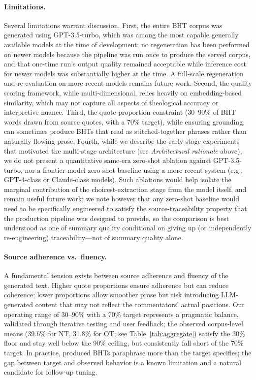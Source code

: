 \paragraph{Limitations.}
Several limitations warrant discussion. First, the entire BHT corpus was generated using GPT-3.5-turbo, which was among the most capable generally available models at the time of development; no regeneration has been performed on newer models because the pipeline was run once to produce the served corpus, and that one-time run's output quality remained acceptable while inference cost for newer models was substantially higher at the time. A full-scale regeneration and re-evaluation on more recent models remains future work. Second, the quality scoring framework, while multi-dimensional, relies heavily on embedding-based similarity, which may not capture all aspects of theological accuracy or interpretive nuance. Third, the quote-proportion constraint (30--90\% of BHT words drawn from source quotes, with a 70\% target), while ensuring grounding, can sometimes produce BHTs that read as stitched-together phrases rather than naturally flowing prose. Fourth, while we describe the early-stage experiments that motivated the multi-stage architecture (see \textit{Architectural rationale} above), we do not present a quantitative same-era zero-shot ablation against GPT-3.5-turbo, nor a frontier-model zero-shot baseline using a more recent system (e.g., GPT-4-class or Claude-class models). Such ablations would help isolate the marginal contribution of the choicest-extraction stage from the model itself, and remain useful future work; we note however that any zero-shot baseline would need to be specifically engineered to satisfy the source-traceability property that the production pipeline was designed to provide, so the comparison is best understood as one of summary quality conditional on giving up (or independently re-engineering) traceability---not of summary quality alone.

\paragraph{Source adherence vs.\ fluency.}
A fundamental tension exists between source adherence and fluency of the generated text. Higher quote proportions ensure adherence but can reduce coherence; lower proportions allow smoother prose but risk introducing LLM-generated content that may not reflect the commentators' actual positions. Our operating range of 30--90\% with a 70\% target represents a pragmatic balance, validated through iterative testing and user feedback; the observed corpus-level means (39.6\% for NT, 31.8\% for OT; see Table~\ref{tab:aggregate}) satisfy the 30\% floor and stay well below the 90\% ceiling, but consistently fall short of the 70\% target. In practice, produced BHTs paraphrase more than the target specifies; the gap between target and observed behavior is a known limitation and a natural candidate for follow-up tuning.

